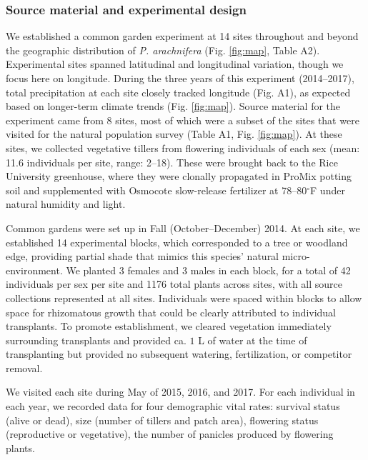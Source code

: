 \documentclass[11pt]{article}\usepackage[]{graphicx}\usepackage[]{color}
\begin{document}
\subsubsection*{Source material and experimental design}
We established a common garden experiment at 14 sites throughout and beyond the geographic distribution of \textit{P. arachnifera} (Fig. \ref{fig:map}, Table A2).
Experimental sites spanned latitudinal and longitudinal variation, though we focus here on longitude. 
During the three years of this experiment (2014--2017), total precipitation at each site closely tracked longitude (Fig. A1), as expected based on longer-term climate trends (Fig. \ref{fig:map}).
Source material for the experiment came from 8 sites, most of which were a subset of the sites that were visited for the natural population survey (Table A1, Fig. \ref{fig:map}). 
At these sites, we collected vegetative tillers from flowering individuals of each sex (mean: 11.6 individuals per site, range: 2--18). 
These were brought back to the Rice University greenhouse, where they were clonally propagated in ProMix potting soil and supplemented with Osmocote slow-release fertilizer at 78--80$^{\circ}$F under natural humidity and light. 

Common gardens were set up in Fall (October--December) 2014. 
At each site, we established 14 experimental blocks, which corresponded to a tree or woodland edge, providing partial shade that mimics this species' natural micro-environment. 
We planted 3 females and 3 males in each block, for a total of 42 individuals per sex per site and 1176 total plants across sites, with all source collections represented at all sites. 
Individuals were spaced within blocks to allow space for rhizomatous growth that could be clearly attributed to individual transplants. 
To promote establishment, we cleared vegetation immediately surrounding transplants and provided ca. $1$ L of water at the time of transplanting but provided no subsequent watering, fertilization, or competitor removal. 

We visited each site during May of 2015, 2016, and 2017. 
For each individual in each year, we recorded data for four demographic vital rates: survival status (alive or dead), size (number of tillers and patch area), flowering status (reproductive or vegetative), the number of panicles produced by flowering plants. %
\end{document}
